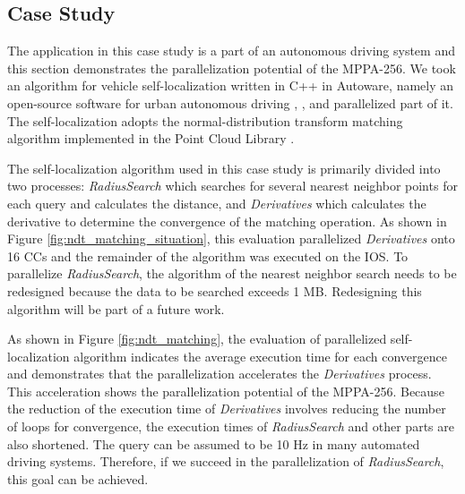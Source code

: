 \documentclass[conference,compsoc]{IEEEtran}
\begin{document}
\subsection{Case Study}
\label{sec:case_study}
The application in this case study is a part of an autonomous driving system and this section demonstrates the parallelization potential of the MPPA-256.
We took an algorithm for vehicle self-localization written in C++ in Autoware, namely an open-source software for urban autonomous driving \cite{autoware}, \cite{kato2015open}, and parallelized part of it.
The self-localization adopts the normal-distribution transform matching algorithm \cite{magnusson2009three} implemented in the Point Cloud Library \cite{pcl}.

The self-localization algorithm used in this case study is primarily divided into two processes: \emph{RadiusSearch} which searches for several nearest neighbor points for each query and calculates the distance, and \emph{Derivatives} which calculates the derivative to determine the convergence of the matching operation.
As shown in Figure \ref{fig:ndt_matching_situation}, this evaluation parallelized \emph{Derivatives} onto 16 CCs and the remainder of the algorithm was executed on the IOS.
To parallelize \emph{RadiusSearch}, the algorithm of the nearest neighbor search needs to be redesigned because the data to be searched exceeds 1 MB.
Redesigning this algorithm will be part of a future work.

As shown in Figure \ref{fig:ndt_matching}, the evaluation of parallelized self-localization algorithm indicates the average execution time for each convergence and demonstrates that the parallelization accelerates the \emph{Derivatives} process.
This acceleration shows the parallelization potential of the MPPA-256.
Because the reduction of the execution time of \emph{Derivatives} involves reducing the number of loops for convergence, the execution times of \emph{RadiusSearch} and other parts are also shortened.
The query can be assumed to be 10 Hz in many automated driving systems.
Therefore, if we succeed in the parallelization of \emph{RadiusSearch}, this goal can be achieved.
\end{document}

